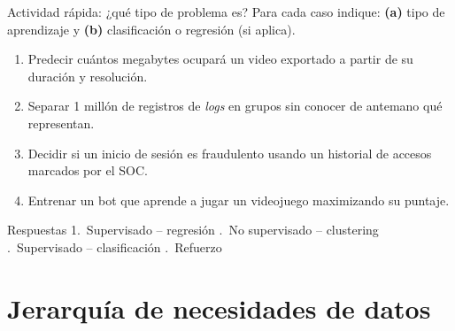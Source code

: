 \documentclass[10pt,aspectratio=169]{beamer}
\begin{document}
\begin{frame}{Actividad rápida: ¿qué tipo de problema es?}
  Para cada caso indique: \textbf{(a)} tipo de aprendizaje y \textbf{(b)} clasificación o regresión (si aplica).
  \medskip
  \begin{enumerate}
    \item Predecir cuántos megabytes ocupará un video exportado a partir de su duración y resolución.
    \item Separar 1 millón de registros de \emph{logs} en grupos sin conocer de antemano qué representan.
    \item Decidir si un inicio de sesión es fraudulento usando un historial de accesos marcados por el SOC.
    \item Entrenar un bot que aprende a jugar un videojuego maximizando su puntaje.
  \end{enumerate}
  \vfill
  \pause
  \begin{exampleblock}{Respuestas}
    \small
    1.~Supervisado -- regresión .~No supervisado -- clustering .~Supervisado -- clasificación .~Refuerzo
  \end{exampleblock}
\end{frame}

\section{Jerarquía de necesidades de datos}
\end{document}
